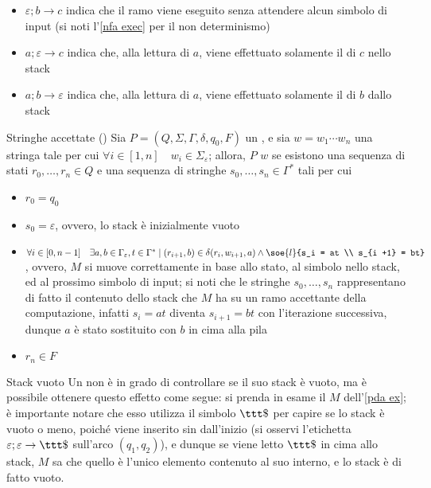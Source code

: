 \documentclass[a4paper, 12pt]{report}
\begin{document}
\begin{example}[\PDA]
        \begin{itemize}
            \item $\varepsilon; b \to c$ indica che il ramo viene eseguito senza attendere alcun simbolo di input (si noti l'\cref{nfa exec} per il non determinismo)
            \item $a; \varepsilon \to c$ indica che, alla lettura di $a$, viene effettuato solamente il  di $c$ nello stack
            \item $a; b \to \varepsilon$ indica che, alla lettura di $a$, viene effettuato solamente il  di $b$ dallo stack
        \end{itemize}
    \end{example}

    \begin{frameddefn}{Stringhe accettate (\PDA)}
        Sia $P = (Q, \Sigma, \Gamma, \delta, q_0, F)$ un \PDA, e sia $w = w_1\cdots w_n$ una stringa tale per cui $\forall i \in [1, n] \quad w_i \in \Sigma_\varepsilon$; allora, $P$  $w$ se esistono una sequenza di stati $r_0, \ldots, r_n \in Q$ e una sequenza di stringhe $s_0, \ldots, s_n \in \Gamma ^*$ tali per cui

        \begin{itemize}
            \item $r_0 = q_0$
            \item $s_0 = \varepsilon$, ovvero, lo stack è inizialmente vuoto
            \item $\forall i \in [0, n - 1] \quad \exists a, b \in \Gamma_\varepsilon, t \in \Gamma^* \mid (r_{i + 1}, b) \in \delta(r_i, w_{i + 1}, a) \land \soe{l}{s_i = at \\ s_{i +1} = bt}$, ovvero, $M$ si muove correttamente in base allo stato, al simbolo nello stack, ed al prossimo simbolo di input; si noti che le stringhe $s_0, \ldots, s_n$ rappresentano di fatto il contenuto dello stack che $M$ ha su un ramo accettante della computazione, infatti $s_i = at$ diventa $s_{i + 1} = bt$ con l'iterazione successiva, dunque $a$ è stato sostituito con $b$ in cima alla pila
            \item $r_n \in F$
        \end{itemize}
    \end{frameddefn}

    \begin{framedobs}[label={pda empty stack}]{Stack vuoto}
        Un \PDA non è in grado di controllare se il suo stack è vuoto, ma è possibile ottenere questo effetto come segue: si prenda in esame il \PDA $M$ dell'\cref{pda ex}; è importante notare che esso utilizza il simbolo $\ttt \$$ per capire se lo stack è vuoto o meno, poiché viene inserito sin dall'inizio (si osservi l'etichetta $\varepsilon; \varepsilon \to \ttt \$$ sull'arco $(q_1, q_2)$), e dunque se viene letto $\ttt \$$ in cima allo stack, $M$ sa che quello è l'unico elemento contenuto al suo interno, e lo stack è di fatto vuoto.
    \end{framedobs}
\end{document}
